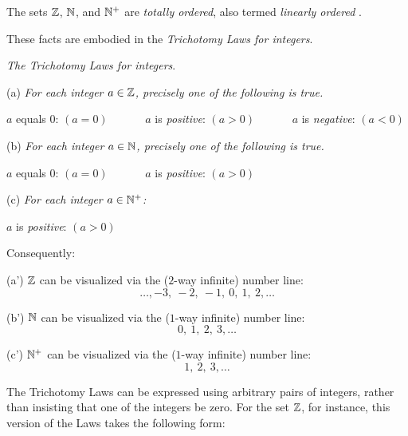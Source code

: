 The sets $\mathbb{Z}$, $\mathbb{N}$, and $\mathbb{N}^+$ are {\em totally ordered},
also termed {\em linearly ordered}
.

\smallskip

These facts are embodied in the {\em Trichotomy Laws for integers}.

\medskip

{\it The Trichotomy Laws for integers}.

\smallskip

(a)
%
{\it For each integer $a \in \mathbb{Z}$, precisely one of the following is true.}

\hspace*{.2in} $a$ equals $0$: $(a=0)$ \ \ \ \ \ \
 $a$ is {\em positive}: $(a>0)$ \ \ \ \ \ \
 $a$ is {\em negative}: $(a<0)$

\smallskip

(b)
%
{\it For each integer $a \in \mathbb{N}$, precisely one of the following is true.}

\hspace*{.2in} $a$ equals $0$: $(a=0)$ \ \ \ \ \ \
 $a$ is {\em positive}: $(a>0)$

\smallskip

(c)
%
{\it For each integer $a \in \mathbb{N}^+$:}

\hspace*{.2in} $a$ is {\em positive}: $(a>0)$

\bigskip

Consequently:

\smallskip

(a')
$\mathbb{Z}$ can be visualized via the ($2$-way infinite) number line:
\[ \ldots, -3, \  -2, \ -1, \ 0, \ 1,\  2, \ldots \]

\smallskip

(b')
$\mathbb{N}$ can be visualized via the ($1$-way infinite) number line:
\[  0, \ 1, \ 2, \ 3, \ldots \]

\smallskip

(c')
$\mathbb{N}^+$ can be visualized via the ($1$-way infinite) number line:
\[  1, \ 2, \ 3, \ldots \]


\bigskip

The Trichotomy Laws can be expressed using arbitrary pairs of integers,
rather than insisting that one of the integers be zero.  For the set
$\mathbb{Z}$, for instance, this version of the Laws takes the following form:

